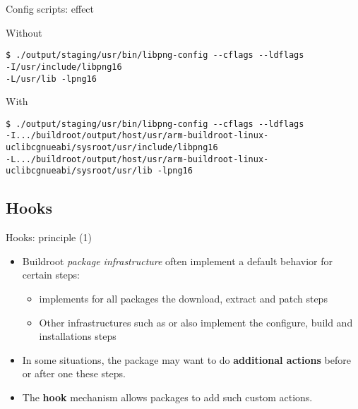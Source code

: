 \begin{frame}[fragile]{Config scripts: effect}

\begin{block}{Without }
{\footnotesize
  \begin{verbatim}
$ ./output/staging/usr/bin/libpng-config --cflags --ldflags
-I/usr/include/libpng16
-L/usr/lib -lpng16
  \end{verbatim}}
\end{block}

\begin{block}{With }
{\tiny
  \begin{verbatim}
$ ./output/staging/usr/bin/libpng-config --cflags --ldflags
-I.../buildroot/output/host/usr/arm-buildroot-linux-uclibcgnueabi/sysroot/usr/include/libpng16
-L.../buildroot/output/host/usr/arm-buildroot-linux-uclibcgnueabi/sysroot/usr/lib -lpng16
  \end{verbatim}}
\end{block}

\end{frame}

\subsection{Hooks}

\begin{frame}{Hooks: principle (1)}
  \begin{itemize}
  \item Buildroot {\em package infrastructure} often implement a
    default behavior for certain steps:
    \begin{itemize}
    \item {} implements for all packages the
      download, extract and patch steps
    \item Other infrastructures such as  or
       also implement the configure, build and
      installations steps
    \end{itemize}
  \item In some situations, the package may want to do {\bf additional
      actions} before or after one these steps.
  \item The {\bf hook} mechanism allows packages to add such custom
    actions.
  \end{itemize}
\end{frame}

